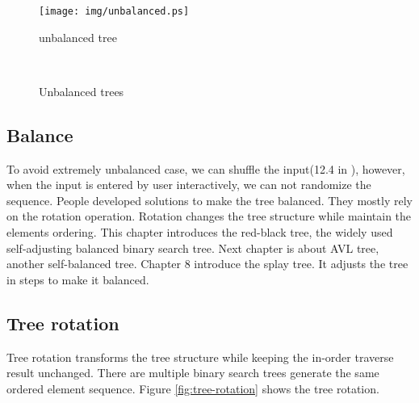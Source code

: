 \documentclass[b5paper]{article}
\begin{document}
\begin{figure}[htbp]
  \centering
  \texttt{[image: img/unbalanced.ps]}
  \caption{unbalanced tree}
  \label{fig:unbalanced-tree}
\end{figure}

\begin{Exercise}
\end{Exercise}

\begin{figure}[htbp]
  \centering
   \\
  \caption{Unbalanced trees}
  \label{fig:unbalanced-trees}
\end{figure}

\subsection{Balance}
To avoid extremely unbalanced case, we can shuffle the input(12.4 in \cite{CLRS}), however, when the input is entered by user interactively, we can not randomize the sequence. People developed solutions to make the tree balanced. They mostly rely on the rotation operation. Rotation changes the tree structure while maintain the elements ordering. This chapter introduces the red-black tree, the widely used self-adjusting balanced binary search tree. Next chapter is about AVL tree, another self-balanced tree. Chapter 8 introduce the splay tree. It adjusts the tree in steps to make it balanced.

\subsection{Tree rotation}

Tree rotation transforms the tree structure while keeping the in-order traverse result unchanged. There are multiple binary search trees generate the same ordered element sequence. Figure \ref{fig:tree-rotation} shows the tree rotation.
\end{document}
